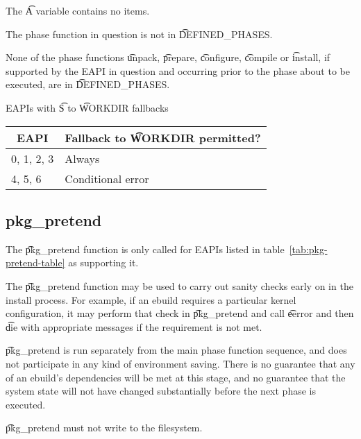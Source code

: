 \begin{compactitem}
\item The \t{A} variable contains no items.
\item The phase function in question is not in \t{DEFINED\_PHASES}.
\item None of the phase functions \t{unpack}, \t{prepare}, \t{configure}, \t{compile} or \t{install},
    if supported by the EAPI in question and occurring prior to the phase about to be executed, are
    in \t{DEFINED\_PHASES}.
\end{compactitem}

\begin{centertable}{EAPIs with \t{S} to \t{WORKDIR} fallbacks}
    \label{tab:s-fallback-table}
    \begin{tabular}{ll}
      \toprule
      \multicolumn{1}{c}{\textbf{EAPI}} &
      \multicolumn{1}{c}{\textbf{Fallback to \t{WORKDIR} permitted?}} \\
      \midrule
      0, 1, 2, 3        & Always            \\
      4, 5, 6           & Conditional error \\
      \bottomrule
    \end{tabular}
\end{centertable}

\subsection{pkg\_pretend}
\label{sec:pkg-pretend-function}

 The \t{pkg\_pretend} function is only called for EAPIs listed in
table~\ref{tab:pkg-pretend-table} as supporting it.

The \t{pkg\_pretend} function may be used to carry out sanity checks early on in the install
process. For example, if an ebuild requires a particular kernel configuration, it may perform that
check in \t{pkg\_pretend} and call \t{eerror} and then \t{die} with appropriate messages if the
requirement is not met.

\t{pkg\_pretend} is run separately from the main phase function sequence, and does not participate
in any kind of environment saving. There is no guarantee that any of an ebuild's dependencies will
be met at this stage, and no guarantee that the system state will not have changed substantially
before the next phase is executed.

\t{pkg\_pretend} must not write to the filesystem.

